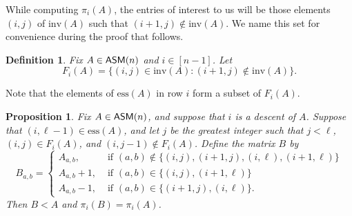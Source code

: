 \documentclass[12 pt]{amsart}
\newtheorem{definition}[Theorem]{Definition}
\newtheorem{proposition}[Theorem]{Proposition}
\numberwithin{equation}{section}
\newcommand{\ess}{\mathrm{ess}}
\newcommand{\inv}{\mathrm{inv}}
\theoremstyle{remark}
\newcommand{\asm}{{\sf ASM}}
\begin{document}
 While computing $\pi_i(A)$, the entries of interest to us will be those elements $(i,j)$ of $\inv(A)$ such that $(i+1,j) \notin \inv(A)$.  We name this set for convenience during the proof that follows.

\begin{definition}
    Fix $A \in \asm(n)$ and $i \in [n-1]$.  Let \[
    F_i(A) = \{(i,j) \in \inv(A) : (i+1,j)\notin \inv(A)\}.
\]
\end{definition}

Note that the elements of $\ess(A)$ in row $i$ form a subset of $F_i(A)$. 

\begin{proposition}\label{prop:toggle-one-block-in-weak-order}
       Fix $A \in \asm(n)$, and suppose that $i$ is a descent of $A$.  Suppose that $(i,\ell-1) \in \ess(A)$, and let $j$ be the greatest integer such that $j < \ell$, $(i,j) \in F_i(A)$, and $(i,j-1) \notin F_i(A)$.  Define the matrix $B$ by \[
    B_{a,b} = \begin{cases}
        A_{a,b}, &\text{ if } (a,b) \notin \{(i,j), (i+1,j), (i, \ell), (i+1,\ell)\}\\
        A_{a,b}+1, &\text{ if } (a,b) \in \{(i,j), (i+1,\ell)\}\\
        A_{a,b}-1, &\text{ if } (a,b) \in \{(i+1,j), (i,\ell)\}.
    \end{cases} 
    \]  Then $B<A$ and $\pi_i(B) = \pi_i(A)$.
   \end{proposition}
\end{document}
